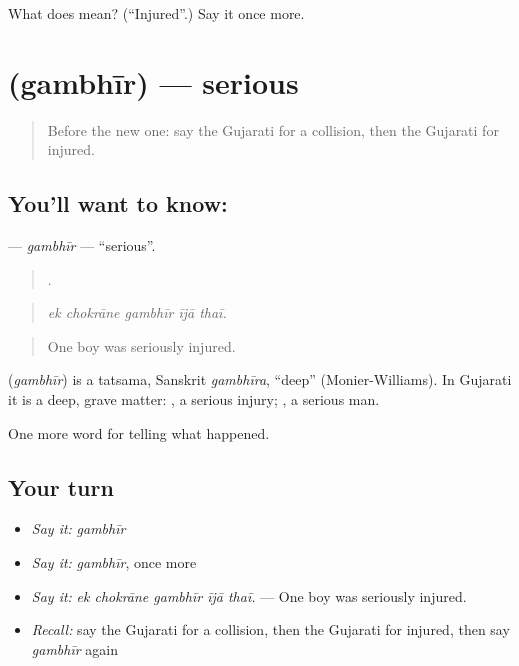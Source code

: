 \begin{tcolorbox}[breakable,colback=teal!4,colframe=teal!35!black,title={Before you move on}]
What does  mean? (\textquotedblleft{}Injured\textquotedblright{}.) Say it once more.
\end{tcolorbox}
\section[\texorpdfstring{\gu{ગંભીર} (gambhīr)}{ગંભીર (gambhīr)}]{ (gambhīr) — serious}

\label{lesson:GU-C293-gambhir}



\begin{quote}
Before the new one: say the Gujarati for a collision, then the Gujarati for injured.
\end{quote}

\subsection*{You'll want to know: }
\textbf{} — \emph{gambhīr} — \textquotedblleft{}serious\textquotedblright{}.

\begin{quote}
    .
\end{quote}

\begin{quote}
\emph{ek chokrāne gambhīr ījā thaī.}
\end{quote}

\begin{quote}
One boy was seriously injured.
\end{quote}

\begin{cousinweb}
\textbf{} (\emph{gambhīr}) is a tatsama, Sanskrit \emph{gambhīra}, \textquotedblleft{}deep\textquotedblright{} (Monier-Williams). In Gujarati it is a deep, grave matter: \textbf{ }, a serious injury; \textbf{ }, a serious man.
\end{cousinweb}

\begin{grammarlens}[title={What you've built}]
One more word for telling what happened.
\end{grammarlens}

\subsection*{Your turn}
\begin{itemize}
\raggedright
  \item \emph{Say it:} \emph{gambhīr}
  \item \emph{Say it:} \emph{gambhīr}, once more
  \item \emph{Say it:} \emph{ek chokrāne gambhīr ījā thaī.} — One boy was seriously injured.
  \item \emph{Recall:} say the Gujarati for a collision, then the Gujarati for injured, then say \emph{gambhīr} again
\end{itemize}

